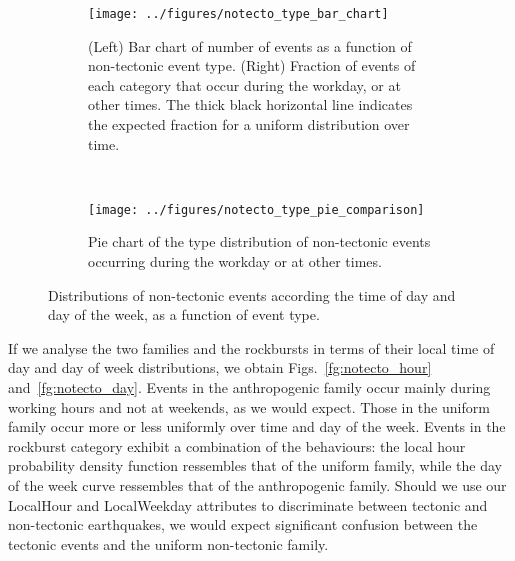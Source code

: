 \begin{figure}
\centering
\begin{subfigure}[t]{\textwidth}
	\centering
	\texttt{[image: ../figures/notecto\_type\_bar\_chart]}
	\caption{(Left) Bar chart of number of events as a function of non-tectonic
	event type. (Right) Fraction of events of each category that occur
	during the workday, or at other times. The thick black horizontal line
	indicates the expected fraction for a uniform distribution over time.} 
	\label{fg:notecto_bar}
\end{subfigure}
~
\begin{subfigure}[t]{\textwidth}
	\centering
	\texttt{[image: ../figures/notecto\_type\_pie\_comparison]}
	\caption{Pie chart of the type distribution of non-tectonic events
	occurring during the workday or at other times.} 
	\label{fg:notecto_pie}
\end{subfigure}
\caption{Distributions of non-tectonic events according the time of day and day
of the week, as a function of event type.}
\label{fg:notecto_day_night}
\end{figure}

If we analyse the two families and the rockbursts in terms of their local time
of day and day of week distributions, we obtain Figs.~\ref{fg:notecto_hour}
and~\ref{fg:notecto_day}. Events in the anthropogenic family occur mainly
during working hours and not at weekends, as we would expect. Those in the
uniform family occur more or less uniformly over time and day of the week.
Events in the rockburst category exhibit a combination of the behaviours: the
local hour probability density function ressembles that of the uniform family,
while the day of the week curve ressembles that of the anthropogenic family.
Should we use our LocalHour and LocalWeekday attributes to discriminate between
tectonic and non-tectonic earthquakes, we would expect significant confusion
between the tectonic events and the uniform non-tectonic family.

